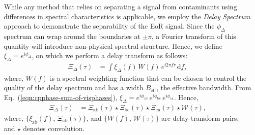 \documentclass[
reprint,
superscriptaddress,
amsmath,
amssymb,
aps,
prd
]{revtex4-1}
\begin{document}
While any method that relies on separating a signal from contaminants using differences in spectral characteristics is applicable, we employ the {\it Delay Spectrum} approach \cite{par12a,par12b} to demonstrate the separability of the EoR signal. Since the $\phi_\Delta$ spectrum can wrap around the boundaries at $\pm\pi$, a Fourier transform of this quantity will introduce non-physical spectral structure. Hence, we define $\xi_\Delta = e^{i\phi_\Delta}$, on which we perform a delay transform as follows:
\begin{align}\label{eqn:cpdspec}
  \Xi_\Delta(\tau) &= \int \xi_\Delta(f)\,W(f)\,e^{i2\pi f\tau}\,\mathrm{d}f,
\end{align}
where, $W(f)$ is a spectral weighting function that can be chosen to control the quality of the delay spectrum \citep{thy13,thy16} and has a width $B_\textrm{eff}$, the effective bandwidth. From Eq.~(\ref{eqn:cpphase-sum-of-visphases}), $\xi_\Delta = e^{i\phi_\textrm{ab}}\,e^{i\phi_\textrm{bc}}\,e^{i\phi_\textrm{ca}}$. Hence,
\begin{align}
  \Xi_\Delta(\tau) &= \Xi_\textrm{ab}(\tau) \star \Xi_\textrm{bc}(\tau) \star \Xi_\textrm{ca}(\tau) \star \mathcal{W}(\tau), \label{eqn:cpdspec-convolution}
\end{align}
where, $\{\xi_\textrm{ab}(f),\,\Xi_\textrm{ab}(\tau)\}$, and $\{W(f),\,\mathcal{W}(\tau)\}$ are delay-transform pairs, and $\star$ denotes convolution. 

\end{document}
